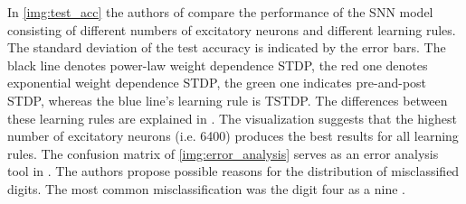 In \autoref{img:test_acc} the authors of \cite{SNN} compare the performance of the \ac{SNN} model consisting of different numbers of excitatory neurons 
and different learning rules.
The standard deviation of the test accuracy is indicated by the error bars.
The black line denotes power-law weight dependence \ac{STDP}, the red one denotes exponential weight dependence \ac{STDP}, 
the green one indicates pre-and-post \ac{STDP}, whereas the blue line's learning rule is \ac{TSTDP}.
The differences between these learning rules are explained in \cite{SNN}.
The visualization suggests that the highest number of excitatory neurons (i.e. 6400) produces the best results for all learning rules.
The confusion matrix of \autoref{img:error_analysis} serves as an error analysis tool in \cite{SNN}.
The authors propose possible reasons for the distribution of misclassified digits.
The most common misclassification was the digit four as a nine \cite{SNN}.

